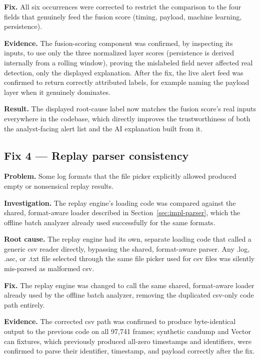 \textbf{Fix.} All six occurrences were corrected to restrict the comparison to the four fields that genuinely feed the fusion score (timing, payload, machine learning, persistence).

\textbf{Evidence.} The fusion-scoring component was confirmed, by inspecting its inputs, to use only the three normalized layer scores (persistence is derived internally from a rolling window), proving the mislabeled field never affected real detection, only the displayed explanation. After the fix, the live alert feed was confirmed to return correctly attributed labels, for example naming the payload layer when it genuinely dominates.

\textbf{Result.} The displayed root-cause label now matches the fusion score's real inputs everywhere in the codebase, which directly improves the trustworthiness of both the analyst-facing alert list and the AI explanation built from it.

\subsection{Fix 4 — Replay parser consistency}

\textbf{Problem.} Some log formats that the file picker explicitly allowed produced empty or nonsensical replay results.

\textbf{Investigation.} The replay engine's loading code was compared against the shared, format-aware loader described in Section~\ref{sec:impl-parser}, which the offline batch analyzer already used successfully for the same formats.

\textbf{Root cause.} The replay engine had its own, separate loading code that called a generic \gls{csv} reader directly, bypassing the shared, format-aware parser. Any .log, .asc, or .txt file selected through the same file picker used for \gls{csv} files was silently mis-parsed as malformed \gls{csv}.

\textbf{Fix.} The replay engine was changed to call the same shared, format-aware loader already used by the offline batch analyzer, removing the duplicated \gls{csv}-only code path entirely.

\textbf{Evidence.} The corrected \gls{csv} path was confirmed to produce byte-identical output to the previous code on all 97{,}741 frames; synthetic candump and Vector \gls{can} fixtures, which previously produced all-zero timestamps and identifiers, were confirmed to parse their identifier, timestamp, and payload correctly after the fix.

